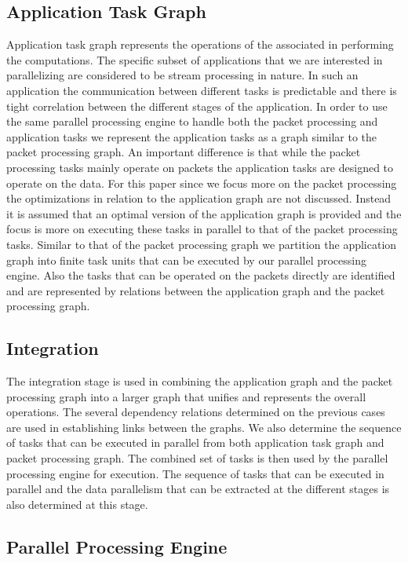 \documentclass[conference]{IEEEtran}
\begin{document}
\subsection{Application Task Graph}

Application task graph represents the operations of the associated in performing the computations. The specific subset of applications that we are interested in parallelizing are considered to be stream processing in nature. In such an application the communication between different tasks is predictable and there is tight correlation between the different stages of the application. In order to use the same parallel processing engine to handle both the packet processing and application tasks we represent the application tasks as a graph similar to the packet processing graph. An important difference is that while the packet processing tasks mainly operate on packets the application tasks are designed to operate on the data. For this paper since we focus more on the packet processing the optimizations in relation to the application graph are not discussed. Instead it is assumed that an optimal version of the application graph is provided and the focus is more on executing these tasks in parallel to that of the packet processing tasks. Similar to that of the packet processing graph we partition the application graph into finite task units that can be executed by our parallel processing engine. Also the tasks that can be operated on the packets directly are identified and are represented by relations between the application graph and the packet processing graph.

\subsection{Integration}

The integration stage is used in combining the application graph and the packet processing graph into a larger graph that unifies and represents the overall operations. The several dependency relations determined on the previous cases are used in establishing links between the graphs. We also determine the sequence of tasks that can be executed in parallel from both application task graph and packet processing graph. The combined set of tasks is then used by the parallel processing engine for execution. The sequence of tasks that can be executed in parallel and the data parallelism that can be extracted at the different stages is also determined at this stage.

\subsection{Parallel Processing Engine}
\end{document}

